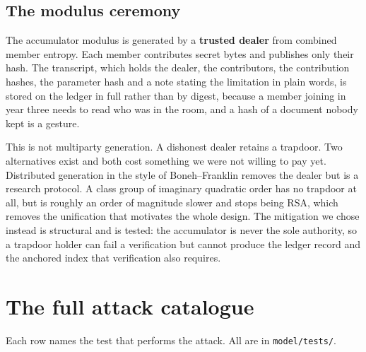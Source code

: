 \subsection{The modulus ceremony}

The accumulator modulus is generated by a \textbf{trusted dealer} from combined
member entropy. Each member contributes secret bytes and publishes only their
hash. The transcript, which holds the dealer, the contributors, the contribution
hashes, the parameter hash and a note stating the limitation in plain words, is
stored on the ledger in
full rather than by digest, because a member joining in year three needs to read
who was in the room, and a hash of a document nobody kept is a gesture.

This is not multiparty generation. A dishonest dealer retains a trapdoor. Two
alternatives exist and both cost something we were not willing to pay yet.
Distributed generation in the style of Boneh--Franklin removes the dealer but is a
research protocol. A class group of imaginary quadratic order has no trapdoor at
all, but is roughly an order of magnitude slower and stops being RSA, which
removes the unification that motivates the whole design. The mitigation we chose
instead is structural and is tested: the accumulator is never the sole authority,
so a trapdoor holder can fail a verification but cannot produce the ledger record
and the anchored index that verification also requires.

\section{The full attack catalogue}

Each row names the test that performs the attack. All are in
\texttt{model/tests/}.

